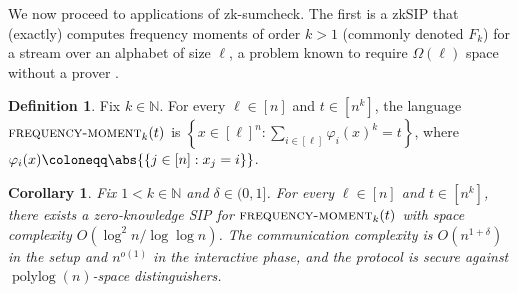\documentclass[a4paper,UKenglish,cleveref, autoref, thm-restate]{lipics-v2021}
\newtheorem{corollary}[theorem]{Corollary}
\theoremstyle{definition}
\newtheorem{definition}[theorem]{Definition}
\newcommand{\zksip}{\textrm{zkSIP}}
\newcommand{\N}{\mathbb N}
\renewcommand{\set}[1]{\left\{#1\right\}}
\newcommand{\polylog}{\operatorname{polylog}}
\newcommand{\frequencymoment}{\normalfont\textsc{frequency-moment}\xspace}
\begin{document}
We now proceed to applications of \textsf{zk-sumcheck}. The first is a \zksip{} that (exactly) computes frequency moments of order $k > 1$ (commonly denoted $F_k$) for a stream over an alphabet of size $\ell$, a problem known to require $\Omega(\ell)$ space without a prover \cite{AMS99}.

\begin{definition}
    \label{def:frequency-moment}
    Fix $k \in \N$. For every $\ell \in [n]$ and $t \in [n^k]$, the language $\frequencymoment_k(t)$ is $\set{x \in [\ell]^n : \sum_{i \in [\ell]} \varphi_i(x)^k = t}$, where $\varphi_i(x) \coloneqq \abs{\set{j \in [n] : x_j = i}}$.
\end{definition}

\begin{corollary}
    \label{cor:frequency-moment}
    Fix $1 < k \in \N$ and $\delta \in (0, 1]$. For every $\ell \in [n]$ and $t \in [n^k]$, there exists a zero-knowledge SIP for $\frequencymoment_k(t)$ with space complexity $O(\log^2 n / \log\log n)$. The communication complexity is $O(n^{1 + \delta})$ in the setup and $n^{o(1)}$ in the interactive phase, and the protocol is secure against $\polylog(n)$-space distinguishers.
\end{corollary}
\end{document}
